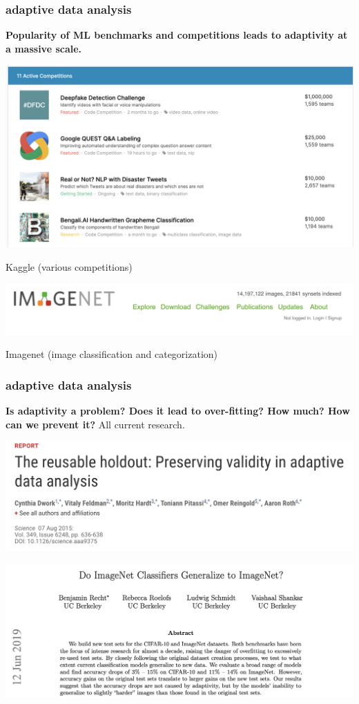 \documentclass[handout,compress]{beamer}
\begin{document}
\begin{frame}
	\frametitle{adaptive data analysis}
	\begin{center}
		\textbf{Popularity of ML benchmarks and competitions leads to adaptivity at a massive scale.}
		
		\includegraphics[width=.7\textwidth]{kaggle.png}
		
		\vspace{-1em}
		Kaggle (various competitions)
		
		\vspace{1em}
		\includegraphics[width=.7\textwidth]{imagenet.png}
		
		\vspace{-1em}
		Imagenet (image classification and categorization)
	\end{center}
	
\end{frame}

\begin{frame}
	\frametitle{adaptive data analysis}
	\begin{center}
			\textbf{Is adaptivity a problem? Does it lead to over-fitting? How much? How can we prevent it?} All current research.
			
			\includegraphics[width=.8\textwidth]{holdout.png}

			\includegraphics[width=.8\textwidth]{adaptivity.png}
	\end{center}
\end{frame}
\end{document}
